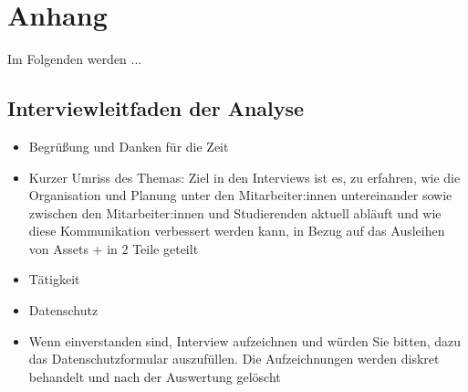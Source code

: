 \renewcommand{\thesection}{\Alph{section}}
\chapter{Anhang}
Im Folgenden werden ...

\section{Interviewleitfaden der Analyse}
\label{appendix:interview}

\begin{itemize}
    \item Begrüßung und Danken für die Zeit
    \item Kurzer Umriss des Themas: Ziel in den Interviews ist es, zu erfahren, wie die Organisation
          und Planung unter den Mitarbeiter:innen untereinander sowie zwischen den Mitarbeiter:innen und
          Studierenden aktuell abläuft und wie diese Kommunikation verbessert werden kann, in Bezug auf
          das Ausleihen von Assets + in 2 Teile geteilt
    \item Tätigkeit
    \item Datenschutz
    \item Wenn einverstanden sind, Interview aufzeichnen und würden Sie bitten, dazu das
          Datenschutzformular auszufüllen. Die Aufzeichnungen werden diskret behandelt und nach der
          Auswertung gelöscht
\end{itemize}

